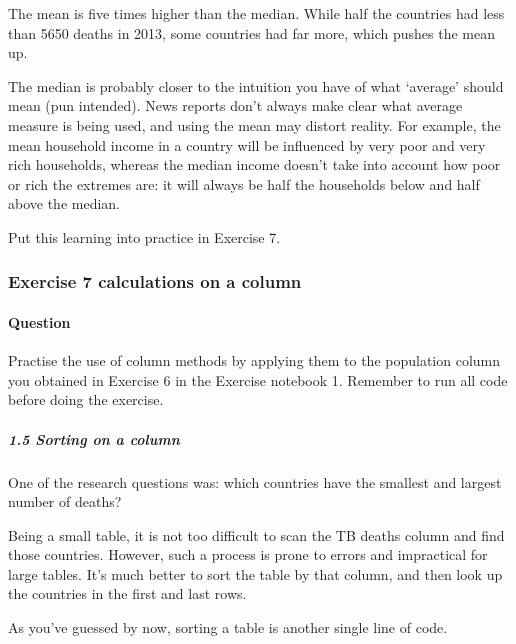 \documentclass[letterpaper,10pt,english]{sphinxmanual}
\begin{document}




The mean is five times higher than the median. While half the countries had less than 5650 deaths in 2013, some countries had far more, which pushes the mean up.

The median is probably closer to the intuition you have of what ‘average’ should mean (pun intended). News reports don’t always make clear what average measure is being used, and using the mean may distort reality. For example, the mean household income in a country will be influenced by very poor and very rich households, whereas the median income doesn’t take into account how poor or rich the extremes are: it will always be half the households below and half above the median.

Put this learning into practice in Exercise 7.


\subsubsection{Exercise 7 calculations on a column}
\label{\detokenize{content/session_02/Part_02_01:Exercise-7-calculations-on-a-column}}

\paragraph{Question}
\label{\detokenize{content/session_02/Part_02_01:id4}}
Practise the use of column methods by applying them to the population column you obtained in Exercise 6 in the Exercise notebook 1. Remember to run all code before doing the exercise.


\subparagraph{1.5 Sorting on a column}
\label{\detokenize{content/session_02/Part_02_01:1.5-Sorting-on-a-column}}
One of the research questions was: which countries have the smallest and largest number of deaths?

Being a small table, it is not too difficult to scan the TB deaths column and find those countries. However, such a process is prone to errors and impractical for large tables. It’s much better to sort the table by that column, and then look up the countries in the first and last rows.

As you’ve guessed by now, sorting a table is another single line of code.
\end{document}

